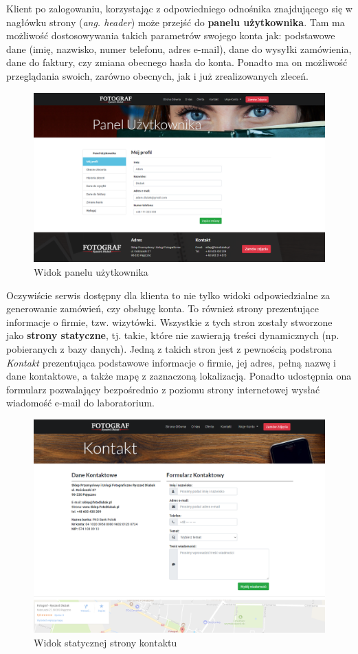 \noindent Klient po zalogowaniu, korzystając z odpowiedniego odnośnika znajdującego się w nagłówku strony (\textit{ang. header}) może przejść do \textbf{panelu użytkownika}. Tam ma możliwość dostosowywania takich parametrów swojego konta jak: podstawowe dane (imię, nazwisko, numer telefonu, adres e-mail), dane do wysyłki zamówienia, dane do faktury, czy zmiana obecnego hasła do konta. Ponadto ma on możliwość przeglądania swoich, zarówno obecnych, jak i już zrealizowanych zleceń.

\begin{figure}[ht]
	\centering
	\includegraphics[width=0.85\linewidth]{graphics/chapter-4/screen-3.png}
	\caption{Widok panelu użytkownika}
	\label{fig:screen-3}
\end{figure}

\noindent Oczywiście serwis dostępny dla klienta to nie tylko widoki odpowiedzialne za generowanie zamówień, czy obsługę konta. To również strony prezentujące informacje o firmie, tzw. wizytówki. Wszystkie z tych stron zostały stworzone jako \textbf{strony statyczne}, tj. takie, które nie zawierają treści dynamicznych (np. pobieranych z bazy danych). Jedną z takich stron jest z pewnością podstrona \textit{Kontakt} prezentująca podstawowe informacje o firmie, jej adres, pełną nazwę i dane kontaktowe, a także mapę z zaznaczoną lokalizacją. Ponadto udostępnia ona formularz pozwalający bezpośrednio z poziomu strony internetowej wysłać wiadomość e-mail do laboratorium.

\begin{figure}[ht]
	\centering
	\includegraphics[width=0.85\linewidth]{graphics/chapter-4/screen-4.png}
	\caption{Widok statycznej strony kontaktu}
	\label{fig:screen-4}
\end{figure}


